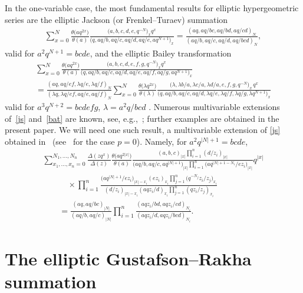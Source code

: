 \documentclass[pdftex]{sigma}
\numberwithin{equation}{section}
\begin{document}
In the one-variable case, the most fundamental results for elliptic hypergeometric series are the
elliptic Jackson (or Frenkel--Turaev) summation
\begin{gather}\label{js}\sum_{x=0}^N\frac{\theta\big(aq^{2x}\big)}{\theta(a)}\frac{\big(a,b,c,d,e,q^{-N}\big)_x q^x}{\big(q,aq/b,aq/c,aq/d,aq/e,aq^{N+1}\big)_x}=\frac{(aq,aq/bc,aq/bd,aq/cd)_N}{(aq/b,aq/c,aq/d,aq/bcd)_N},\end{gather}
valid for $a^2q^{N+1}=bcde$, and the elliptic Bailey transformation
\begin{gather}\label{bat}\sum_{x=0}^N\frac{\theta\big(aq^{2x}\big)}{\theta(a)}\frac{\big(a,b,c,d,e,f,g,q^{-N}\big)_x q^x}{\big(q,aq/b,aq/c,aq/d,aq/e,aq/f,aq/g,aq^{N+1}\big)_x}\\
=\frac{(aq,aq/ef,\lambda q/e,\lambda q/f)_N}{(\lambda q,\lambda q/ef,aq/e,aq/f)_N} \sum_{x=0}^N\frac{\theta\big(\lambda q^{2x}\big)}{\theta(\lambda)}\frac{\big(\lambda,\lambda b/a,\lambda c/a,\lambda d/a,e,f,g,q^{-N}\big)_x\,q^x}{\big(q,aq/b,aq/c,aq/d,\lambda q/e,\lambda q/f,\lambda q/g,\lambda q^{N+1}\big)_x}\nonumber
\end{gather}
valid for $a^3q^{N+2}=bcdefg$, $\lambda =a^2q/bcd$ \cite{ft}. Numerous multivariable extensions of~\eqref{js} and~\eqref{bat} are known, see, e.g.,~\cite{cg,rbc,rw,r,rs1,rs,sw,w}; further examples are obtained in the present paper. We will need one such result, a multivariable extension of \eqref{js} obtained in~\cite{rs} (see~\cite{sc} for the case $p=0$). Namely, for $a^2q^{|N|+1}=bcde$,
\begin{gather}
\sum_{x_1,\dots,x_n=0}^{N_1,\dots,N_n}\frac{\Delta(zq^x)}{\Delta(z)}\frac{\theta\big(aq^{2|x|}\big)} {\theta(a)}\frac{(a,b,c)_{|x|}\prod\limits_{i=1}^n(d/z_i)_{|x|}}{\big(aq/b,aq/c,aq^{|N|+1}\big)_{|x|}
\prod\limits_{i=1}^n\big(aq^{|N|+1-N_i}/ez_i\big)_{|x|}}q^{|x|}\nonumber\\
\qquad\quad{}\times\prod\limits_{i=1}^n\frac{\big(aq^{|N|+1}/ez_i\big)_{|x|-x_i}(ez_i)_{x_i}\prod\limits_{j=1}^n\big(q^{-N_j}z_i/z_j\big)_{x_i}}
{(d/z_i)_{|x|-x_i}(aqz_i/d)_{x_i}\prod\limits_{j=1}^n(qz_i/z_j)_{x_i}}\nonumber\\
\qquad{}=\frac{(aq,aq/bc)_{|N|}}{(aq/b,aq/c)_{|N|}}\prod\limits_{i=1}^n\frac{(aqz_i/bd,aqz_i/cd)_{N_i}}{(aqz_i/d,aqz_i/bcd)_{N_i}}.\label{rsi}
\end{gather}

\section{The elliptic Gustafson--Rakha summation}\label{ms}
\end{document}
